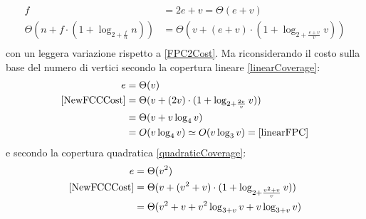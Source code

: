 \begin{enumerate}
\begin{enumerate}[resume]
\begin{itemize}
\begin{equation}
\begin{aligned}
                                                f                                          & = 2 e + v = \Theta(e + v)                              \\
                                                \Theta(n+f\cdot (1+\log_{2+\frac{f}{n}}n)) & = \Theta(v + (e+v) \cdot ( 1+\log_{2+\frac{e+v}{v}}v)) \\
                                          \end{aligned}
                                    \end{equation}
                                    con un leggera variazione rispetto a \eqref{FPC2Cost}. Ma riconsiderando il costo sulla base del numero di vertici
                                    secondo la copertura lineare \eqref{linearCoverage}:
                                    \begin{equation}
                                          \begin{aligned}
                                                e                  & = \Theta(v)                                           \\
                                                \eqref{NewFCCCost} & = \Theta(v + (2v) \cdot (1 + \log_{2+\frac{2v}{v}}v)) \\
                                                                   & = \Theta(v + v\log_4v)                                \\
                                                                   & = O(v\log_4v) \simeq O(v\log_3v) = \eqref{linearFPC}
                                          \end{aligned}
                                    \end{equation}
                                    e secondo la copertura quadratica \eqref{quadraticCoverage}:
                                    \begin{equation}
                                          \begin{aligned}
                                                e                  & = \Theta(v^2)                                                             \\
                                                \eqref{NewFCCCost} & = \Theta(v + (v^2 + v) \cdot (1 + \log_{2+\frac{v^2+v}{v}}v))             \\
                                                                   & = \Theta(v^2 + v + v^2\log_{3+v}v + v\log_{3+v}v)                         \\

\end{aligned}
\end{equation}
\end{itemize}
\end{enumerate}
\end{enumerate}
